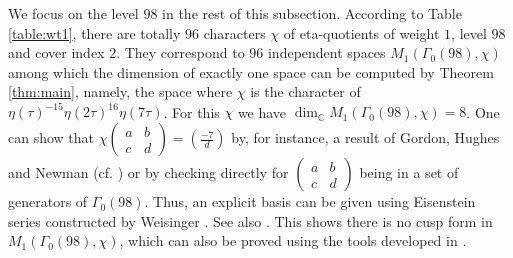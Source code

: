 \documentclass[12pt]{amsart}
\numberwithin{equation}{section}
\theoremstyle{plain}
\theoremstyle{definition}
\theoremstyle{remark}
\newcommand\legendre[2]{\genfrac{(}{)}{}{}{#1}{#2}}
\newcommand\tbtmat[4]{\left(\begin{smallmatrix}{#1} & {#2} \\ {#3} & {#4}\end{smallmatrix}\right)}
\newcommand\numC{\mathbb{C}}
\begin{document}
We focus on the level $98$ in the rest of this subsection. According to Table \ref{table:wt1}, there are totally $96$ characters $\chi$ of eta-quotients of weight $1$, level $98$ and cover index $2$. They correspond to $96$ independent spaces $M_1(\Gamma_0(98),\chi)$ among which the dimension of exactly one space can be computed by Theorem \ref{thm:main}, namely, the space where $\chi$ is the character of $\eta(\tau)^{-15}\eta(2\tau)^{16}\eta(7\tau)$. For this $\chi$ we have $\dim_\numC M_1(\Gamma_0(98),\chi)=8$. One can show that $\chi\tbtmat{a}{b}{c}{d}=\legendre{-7}{d}$ by, for instance, a result of Gordon, Hughes and Newman (cf. \cite[Theorem 1.64]{Ono04}) or by checking directly for $\tbtmat{a}{b}{c}{d}$ being in a set of generators of $\Gamma_0(98)$. Thus, an explicit basis can be given using Eisenstein series constructed by Weisinger \cite{Wei77}. See also \cite[Theorem 8.5.23]{CS17}. This shows there is no cusp form in $M_1(\Gamma_0(98),\chi)$, which can also be proved using the tools developed in \cite{DS74}.
\end{document}
